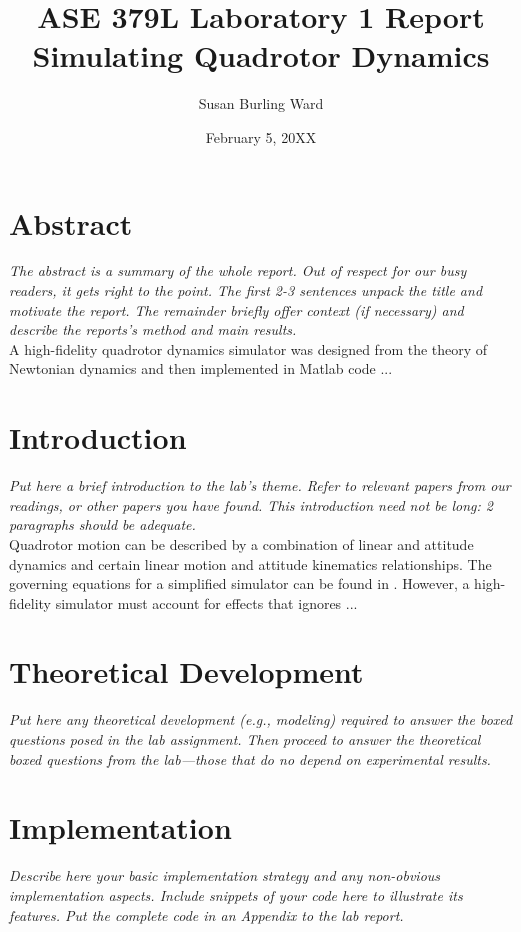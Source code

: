 \documentclass[11pt]{article}
\title{ASE 379L Laboratory 1 Report \\ Simulating Quadrotor Dynamics}
\author{Susan Burling Ward} \date{February 5, 20XX}
\begin{document}
\maketitle
\section{Abstract} \emph{The abstract is a summary of the whole report.  Out
  of respect for our busy readers, it gets right to the point.  The first 2-3
  sentences unpack the title and motivate the report.  The remainder briefly
  offer context (if necessary) and describe the reports's method and
  main results.} \\

A high-fidelity quadrotor dynamics simulator was designed from the theory of
Newtonian dynamics and then implemented in Matlab code ...

\section{Introduction} \emph{Put here a brief introduction to the lab's
theme. Refer to relevant papers from our readings, or other papers you have
found.  This introduction need not be long: 2 paragraphs should be adequate.}\\

Quadrotor motion can be described by a combination of linear and attitude
dynamics and certain linear motion and attitude kinematics relationships.  The
governing equations for a simplified simulator can be found in
\cite{mellinger2012trajectory}.  However, a high-fidelity simulator must
account for effects that \cite{mellinger2012trajectory} ignores ...

\section{Theoretical Development} \emph{Put here any theoretical development (e.g.,
modeling) required to answer the boxed questions posed in the lab assignment.
Then proceed to answer the theoretical boxed questions from the lab---those
that do no depend on experimental results.}

\section{Implementation} \emph{Describe here your basic implementation strategy and
any non-obvious implementation aspects.  Include snippets of your code
here to illustrate its features.  Put the complete code in an Appendix to the
lab report.}
\end{document}

